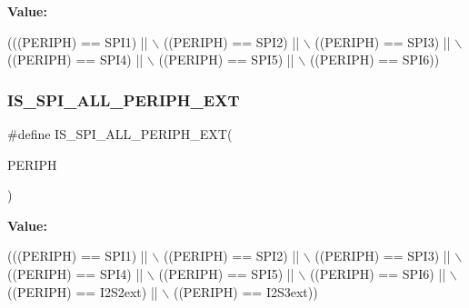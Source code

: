 {\bfseries Value\+:}
\begin{DoxyCode}
(((PERIPH) == SPI1) || \(\backslash\)
                                   ((PERIPH) == SPI2) || \(\backslash\)
                                   ((PERIPH) == SPI3) || \(\backslash\)
                                   ((PERIPH) == SPI4) || \(\backslash\)
                                   ((PERIPH) == SPI5) || \(\backslash\)
                                   ((PERIPH) == SPI6))
\end{DoxyCode}
\mbox{\label{group___s_p_i___exported___constants_ga6dc428a850ec6181eeef824bacca3544}} 
\subsubsection{\texorpdfstring{I\+S\+\_\+\+S\+P\+I\+\_\+\+A\+L\+L\+\_\+\+P\+E\+R\+I\+P\+H\+\_\+\+E\+XT}{IS\_SPI\_ALL\_PERIPH\_EXT}}
{\footnotesize\ttfamily \#define I\+S\+\_\+\+S\+P\+I\+\_\+\+A\+L\+L\+\_\+\+P\+E\+R\+I\+P\+H\+\_\+\+E\+XT(\begin{DoxyParamCaption}\item[{}]{P\+E\+R\+I\+PH }\end{DoxyParamCaption})}

{\bfseries Value\+:}
\begin{DoxyCode}
(((PERIPH) == SPI1)    || \(\backslash\)
                                       ((PERIPH) == SPI2)    || \(\backslash\)
                                       ((PERIPH) == SPI3)    || \(\backslash\)
                                       ((PERIPH) == SPI4)    || \(\backslash\)
                                       ((PERIPH) == SPI5)    || \(\backslash\)
                                       ((PERIPH) == SPI6)    || \(\backslash\)
                                       ((PERIPH) == I2S2ext) || \(\backslash\)
                                       ((PERIPH) == I2S3ext))
\end{DoxyCode}
